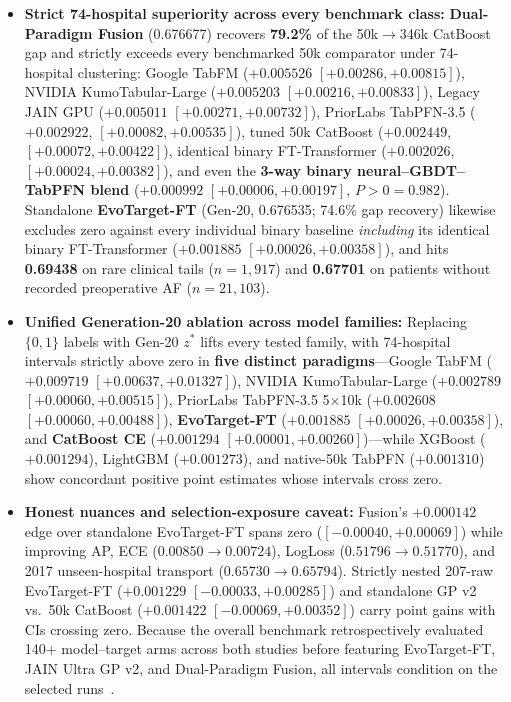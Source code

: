 \begin{itemize}
  \item \textbf{Strict 74-hospital superiority across every benchmark class:} \textbf{Dual-Paradigm Fusion} (0.676677) recovers \textbf{79.2\%} of the 50k$\to$346k CatBoost gap and strictly exceeds every benchmarked 50k comparator under 74-hospital clustering: Google TabFM ($+0.005526$ $[+0.00286, +0.00815]$), NVIDIA KumoTabular-Large ($+0.005203$ $[+0.00216, +0.00833]$), Legacy JAIN GPU ($+0.005011$ $[+0.00271, +0.00732]$), PriorLabs TabPFN-3.5 ($+0.002922$, $[+0.00082,\allowbreak +0.00535]$), tuned 50k CatBoost ($+0.002449$, $[+0.00072,\allowbreak +0.00422]$), identical binary FT-Transformer ($+0.002026$, $[+0.00024,\allowbreak +0.00382]$), and even the \textbf{3-way binary neural--GBDT--TabPFN blend} ($+0.000992$ $[+0.00006, +0.00197]$, $P>0=0.982$). Standalone \textbf{EvoTarget-FT} (Gen-20, 0.676535; 74.6\% gap recovery) likewise excludes zero against every individual binary baseline \emph{including} its identical binary FT-Transformer ($+0.001885$ $[+0.00026, +0.00358]$), and hits \textbf{0.69438} on rare clinical tails ($n=1{,}917$) and \textbf{0.67701} on patients without recorded preoperative AF ($n=21{,}103$).
  \item \textbf{Unified Generation-20 ablation across model families:} Replacing $\{0,1\}$ labels with Gen-20 $z^*$ lifts every tested family, with 74-hospital intervals strictly above zero in \textbf{five distinct paradigms}---Google TabFM ($+0.009719$ $[+0.00637, +0.01327]$), NVIDIA KumoTabular-Large ($+0.002789$ $[+0.00060, +0.00515]$), PriorLabs TabPFN-3.5 5$\times$10k ($+0.002608$ $[+0.00060, +0.00488]$), \textbf{EvoTarget-FT} ($+0.001885$ $[+0.00026, +0.00358]$), and \textbf{CatBoost CE} ($+0.001294$ $[+0.00001, +0.00260]$)---while XGBoost ($+0.001294$), LightGBM ($+0.001273$), and native-50k TabPFN ($+0.001310$) show concordant positive point estimates whose intervals cross zero.
  \item \textbf{Honest nuances and selection-exposure caveat:} Fusion's $+0.000142$ edge over standalone EvoTarget-FT spans zero ($[-0.00040, +0.00069]$) while improving AP, ECE ($0.00850 \to 0.00724$), LogLoss ($0.51796 \to 0.51770$), and 2017 unseen-hospital transport ($0.65730 \to 0.65794$). Strictly nested 207-raw EvoTarget-FT ($+0.001229$ $[-0.00033, +0.00285]$) and standalone GP v2 vs.\ 50k CatBoost ($+0.001422$ $[-0.00069, +0.00352]$) carry point gains with CIs crossing zero. Because the overall benchmark retrospectively evaluated 140+ model--target arms across both studies before featuring EvoTarget-FT, JAIN Ultra GP v2, and Dual-Paradigm Fusion, all intervals condition on the selected runs~\cite{dwork2015reusable}.
\end{itemize}
